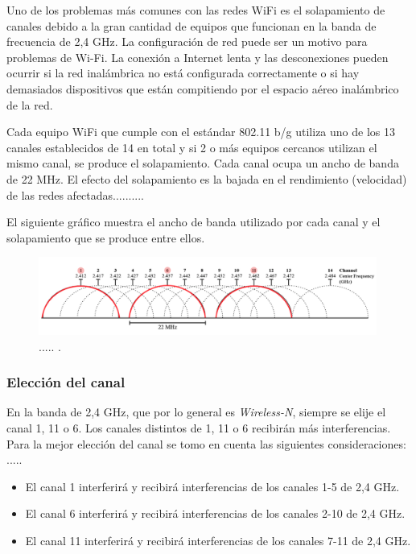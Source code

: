 Uno de los problemas más comunes con las redes WiFi es el solapamiento de canales debido a la gran cantidad de equipos que funcionan en la banda de frecuencia de 2,4 GHz. La configuración de red puede ser un motivo para problemas de Wi-Fi. La conexión a Internet lenta y las desconexiones pueden ocurrir si la red inalámbrica no está configurada correctamente o si hay demasiados dispositivos que están compitiendo por el espacio aéreo inalámbrico de la red. 

Cada equipo WiFi que cumple con el estándar 802.11 b/g utiliza uno de los 13 canales establecidos de 14 en total y si 2 o más equipos cercanos utilizan el mismo canal, se produce el solapamiento. Cada canal ocupa un ancho de banda de 22 MHz. El efecto del solapamiento es la bajada en el rendimiento (velocidad) de las redes afectadas..........

El siguiente gráfico muestra el ancho de banda utilizado por cada canal y el solapamiento que se produce entre ellos.

\begin{figure}[htpb]
\centering 
\includegraphics[width=0.99\textwidth]{./Figures/canales.png}
\caption{..... .}
\label{fig:canales}
\end{figure}

\subsubsection{Elección del canal}
En la banda de 2,4 GHz, que por lo general es \emph{Wireless-N}, siempre se elije el canal 1, 11 o 6. Los canales distintos de 1, 11 o 6 recibirán más interferencias. Para la mejor  elección del canal se tomo en cuenta las siguientes consideraciones: .....

\begin{itemize}
\item El canal 1 interferirá y recibirá interferencias de los canales 1-5 de  2,4 GHz.
\item El canal 6 interferirá y recibirá interferencias de los canales 2-10 de  2,4 GHz.
\item El canal 11 interferirá y recibirá interferencias de los canales 7-11 de 2,4 GHz.
\end{itemize}

